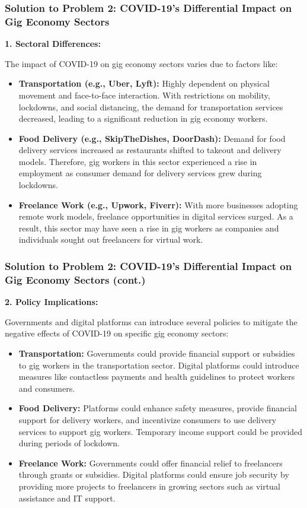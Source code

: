 \documentclass{beamer}
\begin{document}
\begin{frame}
\frametitle{Solution to Problem 2: COVID-19’s Differential Impact on Gig Economy Sectors}
\textbf{1. Sectoral Differences:}

The impact of COVID-19 on gig economy sectors varies due to factors like:
\begin{itemize}
    \item \textbf{Transportation (e.g., Uber, Lyft):} Highly dependent on physical movement and face-to-face interaction. With restrictions on mobility, lockdowns, and social distancing, the demand for transportation services decreased, leading to a significant reduction in gig economy workers.
    \item \textbf{Food Delivery (e.g., SkipTheDishes, DoorDash):} Demand for food delivery services increased as restaurants shifted to takeout and delivery models. Therefore, gig workers in this sector experienced a rise in employment as consumer demand for delivery services grew during lockdowns.
    \item \textbf{Freelance Work (e.g., Upwork, Fiverr):} With more businesses adopting remote work models, freelance opportunities in digital services surged. As a result, this sector may have seen a rise in gig workers as companies and individuals sought out freelancers for virtual work.
\end{itemize}
\end{frame}

\begin{frame}
\frametitle{Solution to Problem 2: COVID-19’s Differential Impact on Gig Economy Sectors (cont.)}
\textbf{2. Policy Implications:}

Governments and digital platforms can introduce several policies to mitigate the negative effects of COVID-19 on specific gig economy sectors:
\begin{itemize}
    \item \textbf{Transportation:} Governments could provide financial support or subsidies to gig workers in the transportation sector. Digital platforms could introduce measures like contactless payments and health guidelines to protect workers and consumers.
    \item \textbf{Food Delivery:} Platforms could enhance safety measures, provide financial support for delivery workers, and incentivize consumers to use delivery services to support gig workers. Temporary income support could be provided during periods of lockdown.
    \item \textbf{Freelance Work:} Governments could offer financial relief to freelancers through grants or subsidies. Digital platforms could ensure job security by providing more projects to freelancers in growing sectors such as virtual assistance and IT support.
\end{itemize}
\end{frame}
\end{document}
